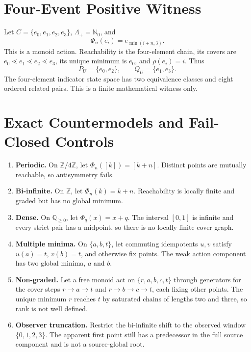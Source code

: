 \documentclass[11pt]{article}
\begin{document}
\section{Four-Event Positive Witness}

Let \(C=\{e_0,e_1,e_2,e_3\}\), \(\Lambda_+=\mathbb N_0\), and
\[
 \Phi_n(e_i)=e_{\min(i+n,3)}.
\]
This is a monoid action. Reachability is the four-element chain, its covers
are \(e_0\lessdot e_1\lessdot e_2\lessdot e_3\), its unique minimum is
\(e_0\), and \(\rho(e_i)=i\). Thus
\[
 P_U=\{e_0,e_2\},\qquad Q_U=\{e_1,e_3\}.
\]
The four-element indicator state space has two equivalence classes and eight
ordered related pairs. This is a finite mathematical witness only.

\section{Exact Countermodels and Fail-Closed Controls}

\begin{enumerate}[label=(C\arabic*)]
  \item \textbf{Periodic.} On \(\mathbb Z/4\mathbb Z\), let
  \(\Phi_n([k])=[k+n]\). Distinct points are mutually reachable, so
  antisymmetry fails.
  \item \textbf{Bi-infinite.} On \(\mathbb Z\), let
  \(\Phi_n(k)=k+n\). Reachability is locally finite and graded but has no
  global minimum.
  \item \textbf{Dense.} On \(\mathbb Q_{\ge0}\), let
  \(\Phi_q(x)=x+q\). The interval \([0,1]\) is infinite and every strict
  pair has a midpoint, so there is no locally finite cover graph.
  \item \textbf{Multiple minima.} On \(\{a,b,t\}\), let commuting
  idempotents \(u,v\) satisfy \(u(a)=t\), \(v(b)=t\), and otherwise fix
  points. The weak action component has two global minima, \(a\) and \(b\).
  \item \textbf{Non-graded.} Let a free monoid act on
  \(\{r,a,b,c,t\}\) through generators for the cover steps
  \(r\to a\to t\) and \(r\to b\to c\to t\), each fixing other points.
  The unique minimum \(r\) reaches \(t\) by saturated chains of lengths two
  and three, so rank is not well defined.
  \item \textbf{Observer truncation.} Restrict the bi-infinite shift to the
  observed window \(\{0,1,2,3\}\). The apparent first point still has a
  predecessor in the full source component and is not a source-global root.
\end{enumerate}
\end{document}
